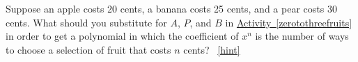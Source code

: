 \documentclass{book}
\begin{document}
\setcounter{project}{242}
\addtocounter{project}{-1}
\begin{activity}[]\label{activity-235}
\hypertarget{p-1324}{}%
Suppose an apple costs 20 cents, a banana costs 25 cents, and a pear costs 30 cents. What should you substitute for \(A\), \(P\), and \(B\) in \hyperref[zerotothreefruits]{Activity~\ref{zerotothreefruits}} in order to get a polynomial in which the coefficient of \(x^n\) is the number of ways to choose a selection of fruit that costs \(n\) cents?%
~\hfill{\tiny\hyperlink{a-242}{[hint]}\hypertarget{q-242}{}}\end{activity}
\end{document}
